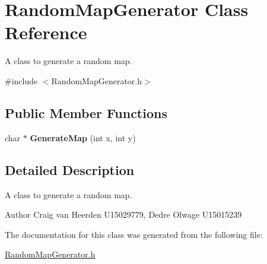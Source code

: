 \hypertarget{class_random_map_generator}{\section{\-Random\-Map\-Generator \-Class \-Reference}
\label{class_random_map_generator}
}


\-A class to generate a random map.  




{\ttfamily \#include $<$\-Random\-Map\-Generator.\-h$>$}

\subsection*{\-Public \-Member \-Functions}
\begin{DoxyCompactItemize}
\item 
\hypertarget{class_random_map_generator_afa6aed2a2ec5b52b490915705e59f205}{char $\ast$ {\bfseries \-Generate\-Map} (int x, int y)}\label{class_random_map_generator_afa6aed2a2ec5b52b490915705e59f205}

\end{DoxyCompactItemize}


\subsection{\-Detailed \-Description}
\-A class to generate a random map. 

\begin{DoxyAuthor}{\-Author}
\-Craig van \-Heerden \-U15029779, \-Dedre \-Olwage \-U15015239 
\end{DoxyAuthor}


\-The documentation for this class was generated from the following file\-:\begin{DoxyCompactItemize}
\item 
\hyperlink{_random_map_generator_8h}{\-Random\-Map\-Generator.\-h}\end{DoxyCompactItemize}
